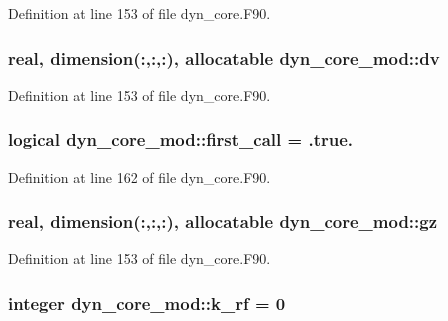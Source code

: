 Definition at line 153 of file dyn\-\_\-core.\-F90.

\subsubsection[{dv}]{\setlength{\rightskip}{0pt plus 5cm}real, dimension(\-:,\-:,\-:), allocatable dyn\-\_\-core\-\_\-mod\-::dv\hspace{0.3cm}{\ttfamily [private]}}\label{classdyn__core__mod_a24c8aa084ba37e9006be8bfd96588330}


Definition at line 153 of file dyn\-\_\-core.\-F90.

\subsubsection[{first\-\_\-call}]{\setlength{\rightskip}{0pt plus 5cm}logical dyn\-\_\-core\-\_\-mod\-::first\-\_\-call = .true.\hspace{0.3cm}{\ttfamily [private]}}\label{classdyn__core__mod_a1dcbe9cc4e2b768f9d5f009c515184b0}


Definition at line 162 of file dyn\-\_\-core.\-F90.

\subsubsection[{gz}]{\setlength{\rightskip}{0pt plus 5cm}real, dimension(\-:,\-:,\-:), allocatable dyn\-\_\-core\-\_\-mod\-::gz\hspace{0.3cm}{\ttfamily [private]}}\label{classdyn__core__mod_add08631b5675064954c9123f29da8d9c}


Definition at line 153 of file dyn\-\_\-core.\-F90.

\subsubsection[{k\-\_\-rf}]{\setlength{\rightskip}{0pt plus 5cm}integer dyn\-\_\-core\-\_\-mod\-::k\-\_\-rf = 0\hspace{0.3cm}{\ttfamily [private]}}\label{classdyn__core__mod_a3f6a838d346b6bea78aa22d2aaf07023}


